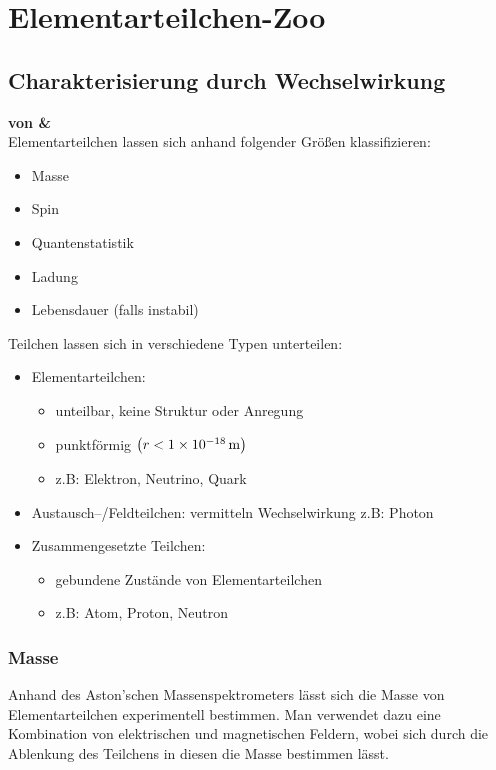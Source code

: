 \documentclass[Ex4_Zusammenfassung.tex]{subfiles}
\begin{document}
\chapter{Elementarteilchen-Zoo}	
\section{Charakterisierung durch Wechselwirkung}
\textbf{von \hein \& \mitsch} \\

Elementarteilchen lassen sich anhand folgender Größen klassifizieren:
\begin{itemize}
\item Masse
\item Spin
\item Quantenstatistik
\item Ladung
\item Lebensdauer (falls instabil)
\end{itemize}
Teilchen lassen sich  in verschiedene Typen unterteilen: 
\begin{itemize}
	\item Elementarteilchen: 
	\begin{itemize}
		\item unteilbar, keine Struktur oder Anregung
		\item punktförmig $\left( r  <  \SI{1E-18}{m}\right)$ 
		\item z.B: Elektron, Neutrino, Quark
	\end{itemize}
	\item Austausch--/Feldteilchen: vermitteln Wechselwirkung z.B: Photon
	\item Zusammengesetzte Teilchen: 
	\begin{itemize}
		\item gebundene Zustände von Elementarteilchen
		\item z.B: Atom, Proton, Neutron
	\end{itemize}
\end{itemize}

\subsection{Masse}
Anhand des Aston'schen Massenspektrometers lässt sich die Masse von Elementarteilchen experimentell bestimmen. 
Man verwendet dazu eine Kombination von elektrischen und magnetischen Feldern, wobei sich durch die Ablenkung des Teilchens in diesen die Masse bestimmen lässt. 
\end{document}
